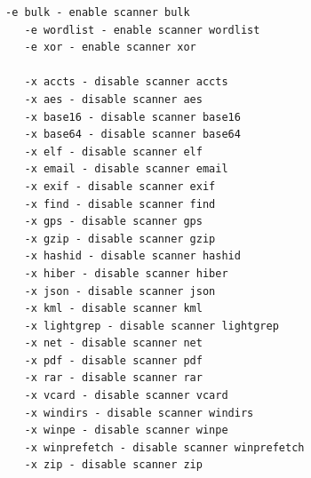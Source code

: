 \documentclass[11pt]{article} %
\begin{document}
\begin{Verbatim}[fontfamily=courier]
   -e bulk - enable scanner bulk
   -e wordlist - enable scanner wordlist
   -e xor - enable scanner xor

   -x accts - disable scanner accts
   -x aes - disable scanner aes
   -x base16 - disable scanner base16
   -x base64 - disable scanner base64
   -x elf - disable scanner elf
   -x email - disable scanner email
   -x exif - disable scanner exif
   -x find - disable scanner find
   -x gps - disable scanner gps
   -x gzip - disable scanner gzip
   -x hashid - disable scanner hashid
   -x hiber - disable scanner hiber
   -x json - disable scanner json
   -x kml - disable scanner kml
   -x lightgrep - disable scanner lightgrep
   -x net - disable scanner net
   -x pdf - disable scanner pdf
   -x rar - disable scanner rar
   -x vcard - disable scanner vcard
   -x windirs - disable scanner windirs
   -x winpe - disable scanner winpe
   -x winprefetch - disable scanner winprefetch
   -x zip - disable scanner zip
\end{Verbatim}
\endgroup
\end{document}
